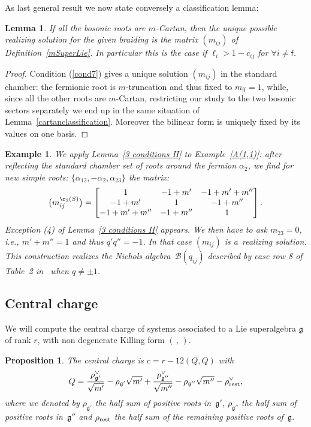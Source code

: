 \documentclass[10pt,a4paper]{amsart}
\numberwithin{equation}{section}
\newtheorem{lem}[teo]{Lemma}
\newtheorem{prop}[teo]{Proposition}
\newtheorem{ese}[teo]{Example}
\newcommand{\f}{\mathsf{f}}
\begin{document}
As last general result we now state conversely a classification lemma:
\begin{lem}\label{superlieclassification}
If all the bosonic roots are $m$-Cartan, then the unique possible realizing solution for the given braiding is the matrix $(m_{ij})$ of Definition~{\rm \ref{mSuperLie}}. In particular this is the case if $\ell_i > 1- c_{ij}$ for $\forall i \neq \f$.
\end{lem}

\begin{proof}
Condition (\ref{cond7}) gives a unique solution $(m_{ij})$ in the standard chamber: the fermionic root is $m$-truncation and thus fixed to $m_{\f\f} =1$, while, since all the other roots are $m$-Cartan, restricting our study to the two bosonic sectors separately we end up in the same situation of Lemma~\ref{cartanclassification}.
Moreover the bilinear form is uniquely fixed by its values on one basis.
\end{proof}

\begin{ese}\label{exm_superDReflection}
We apply Lemma~\ref{3 conditions II} to Example~\ref{A(1,1)}: after reflecting the standard chamber set of roots around the fermion $\alpha_2$, we find for new simple roots: $\lbrace \alpha_{12}, -\alpha_2, \alpha_{23}\rbrace$ the matrix:
\[ \big(m_{ij}^{\r_2(S)}\big)= \begin{bmatrix}
1 & -1 + m' & -1+m' +m'' \\
-1 + m' & 1 & -1 + m'' \\
-1+m' +m'' & -1+m'' & 1	
\end{bmatrix}.
\]
Exception (4) of Lemma~\ref{3 conditions II} appears. We then have to ask $m_{23}=0$, i.e., $m' + m''=1$ and thus $q'q''=-1$. In that case $(m_{ij})$ is a~realizing solution.
This construction realizes the Nichols algebra~$\mathcal{B}(q_{ij})$ described by case row 8 of Table~2 in~\cite{Hecklist} when $q\neq \pm 1$.
\end{ese}

\subsection{Central charge}
We will compute the central charge of systems associated to a Lie superalgebra $\mathfrak{g}$ of rank $r$, with non degenerate Killing form $(\,,\,)$.
\begin{prop}
The central charge is $c= r - 12(Q,Q)$ with \[Q=\frac{\rho_{\mathfrak{g'}}^\vee}{\sqrt{m'}}-\rho_{\mathfrak{g'}}\sqrt{m'}+\frac{\rho_{\mathfrak{g''}}^\vee}{\sqrt{m''}} -\rho_{\mathfrak{g''}}\sqrt{m''}-\rho_{{\rm rest}}^\vee,\]
where we denoted by $\rho_{\mathfrak{g'}}$ the half sum of positive roots in~$\mathfrak{g'}$, $\rho_{\mathfrak{g''}}$ the half sum of positive roots in~$\mathfrak{g''}$ and $\rho_{{\rm rest}}$ the half sum of the remaining positive roots of~$\mathfrak{g}$.
\end{prop}
\end{document}
